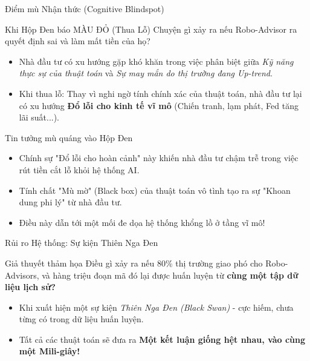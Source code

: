 \documentclass[aspectratio=169, 12pt]{beamer}
\begin{document}
\begin{frame}{Điểm mù Nhận thức (Cognitive Blindspot)}
    \begin{block}{Khi Hộp Đen báo MÀU ĐỎ (Thua Lỗ)}
        Chuyện gì xảy ra nếu Robo-Advisor ra quyết định sai và làm mất tiền của họ?
    \end{block}
    \begin{itemize}
        \item Nhà đầu tư có xu hướng gặp khó khăn trong việc phân biệt giữa \textit{Kỹ năng thực sự của thuật toán} và \textit{Sự may mắn do thị trường đang Up-trend}.
        \item Khi thua lỗ: Thay vì nghi ngờ tính chính xác của thuật toán, nhà đầu tư lại có xu hướng \textbf{Đổ lỗi cho kinh tế vĩ mô} (Chiến tranh, lạm phát, Fed tăng lãi suất...).
    \end{itemize}
\end{frame}

\begin{frame}{Tin tưởng mù quáng vào Hộp Đen}
    \begin{itemize}
        \item Chính sự "Đổ lỗi cho hoàn cảnh" này khiến nhà đầu tư chậm trễ trong việc rút tiền cắt lỗ khỏi hệ thống AI.
        \item Tính chất "Mù mờ" (Black box) của thuật toán vô tình tạo ra sự "Khoan dung phi lý" từ nhà đầu tư.
        \item Điều này dẫn tới một mối đe dọa hệ thống khổng lồ ở tầng vĩ mô!
    \end{itemize}
\end{frame}

\begin{frame}{Rủi ro Hệ thống: Sự kiện Thiên Nga Đen}
    \begin{block}{Giả thuyết thảm họa}
        Điều gì xảy ra nếu 80\% thị trường giao phó cho Robo-Advisors, và hàng triệu đoạn mã đó lại được huấn luyện từ \textbf{cùng một tập dữ liệu lịch sử?}
    \end{block}
    \begin{itemize}
        \item Khi xuất hiện một sự kiện \textit{Thiên Nga Đen (Black Swan)} - cực hiếm, chưa từng có trong dữ liệu huấn luyện.
        \item Tất cả các thuật toán sẽ đưa ra \textbf{Một kết luận giống hệt nhau, vào cùng một Mili-giây!}
    \end{itemize}
\end{frame}
\end{document}
